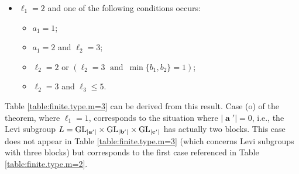 \documentclass[12pt,reqno]{amsart}
\begin{document}
\begin{theorem}
\begin{penumerate}
\begin{itemize}
\item[\rm (d)] $\ell_1=2$ and one of the following conditions occurs:
\begin{itemize}
\item[\rm (d1)] $a_1=1$;
\item[\rm (d2)] $a_1=2$ and $\ell_2=3$;
\item[\rm (d3)] $\ell_2=2$ or $ (\ell_2=3 \; \text{ and } \, \min\{b_1,b_2\}=1) $;
\item[\rm (d4)] $\ell_2=3$ and $\ell_3\leq 5$.
\end{itemize}
\end{itemize}
%
%
%

\end{penumerate}
\end{theorem}

\begin{remark}
Table \ref{table:finite.type.m=3} can be derived from this result.
Case (o) of the theorem, where $\ell_1=1$, corresponds to the situation where $|\mbfa'|=0$, i.e., the Levi subgroup $L=\mathrm{GL}_{|\mathbf{a}'|}\times \mathrm{GL}_{|\mathbf{b}'|}\times \mathrm{GL}_{|\mathbf{c}'|}$ has actually two blocks. This case does not appear in Table \ref{table:finite.type.m=3} (which concerns Levi subgroups with three blocks) but corresponds to the first case referenced in Table \ref{table:finite.type.m=2}.
\end{remark}
\end{document}
